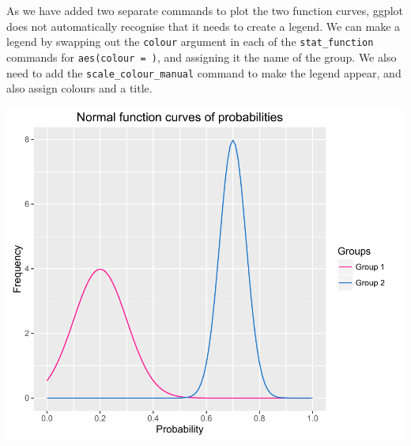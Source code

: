 As we have added two separate commands to plot the two function curves,
ggplot does not automatically recognise that it needs to create a
legend. We can make a legend by swapping out the \texttt{colour}
argument in each of the \texttt{stat\_function} commands for
\texttt{aes(colour\ =\ )}, and assigning it the name of the group. We
also need to add the \texttt{scale\_colour\_manual} command to make the
legend appear, and also assign colours and a title.

\begin{Shaded}
\begin{Highlighting}[]
\StringTok{ }\NormalTok{(}\NormalTok{(} \NormalTok{(}\NormalTok{, }\NormalTok{)), }\NormalTok{(} 
\StringTok{    }\NormalTok{(}  \NormalTok{(}\NormalTok{, }\NormalTok{),}
      \NormalTok{(} \NormalTok{)) +}
\StringTok{    }\NormalTok{(}  \NormalTok{(}\NormalTok{, }\NormalTok{),}
      \NormalTok{(} \NormalTok{)) +}
\StringTok{    }\NormalTok{(} \NormalTok{,}
       \NormalTok{(}\NormalTok{, }\NormalTok{, }\NormalTok{), }\NormalTok{(}\NormalTok{, }\NormalTok{)) +}
\StringTok{    }\NormalTok{(} \NormalTok{) +}
\StringTok{    }\NormalTok{(}\NormalTok{) +}
\StringTok{    }\NormalTok{(}\NormalTok{, } \NormalTok{(}\NormalTok{, }\NormalTok{))}
\end{Highlighting}
\end{Shaded}

\begin{center}\includegraphics[width=0.6\linewidth]{9_Function_Plots_pdf/function_10-1} \end{center}

